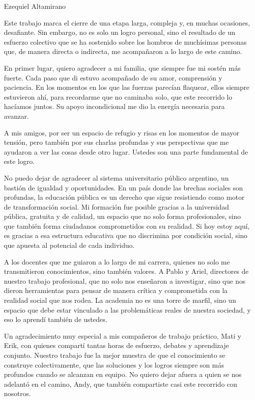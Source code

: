 \begin{acknowledgements}
\vspace{1.5cm}
Ezequiel Altamirano


Este trabajo marca el cierre de una etapa larga, compleja y, en muchas ocasiones, desafiante. Sin embargo, no es solo un logro personal, sino el resultado de un esfuerzo colectivo que se ha sostenido sobre los hombros de muchísimas personas que, de manera directa o indirecta, me acompañaron a lo largo de este camino.

En primer lugar, quiero agradecer a mi familia, que siempre fue mi sostén más fuerte. Cada paso que di estuvo acompañado de su amor, comprensión y paciencia. En los momentos en los que las fuerzas parecían flaquear, ellos siempre estuvieron ahí, para recordarme que no caminaba solo, que este recorrido lo hacíamos juntos. Su apoyo incondicional me dio la energía necesaria para avanzar.

A mis amigos, por ser un espacio de refugio y risas en los momentos de mayor tensión, pero también por sus charlas profundas y sus perspectivas que me ayudaron a ver las cosas desde otro lugar. Ustedes son una parte fundamental de este logro.

No puedo dejar de agradecer al sistema universitario público argentino, un bastión de igualdad y oportunidades. En un país donde las brechas sociales son profundas, la educación pública es un derecho que sigue resistiendo como motor de transformación social. Mi formación fue posible gracias a la universidad pública, gratuita y de calidad, un espacio que no solo forma profesionales, sino que también forma ciudadanos comprometidos con su realidad. Si hoy estoy aquí, es gracias a esa estructura educativa que no discrimina por condición social, sino que apuesta al potencial de cada individuo.

A los docentes que me guiaron a lo largo de mi carrera, quienes no solo me transmitieron conocimientos, sino también valores. A Pablo y Ariel, directores de nuestro trabajo profesional, que no solo nos enseñaron a investigar, sino que nos dieron herramientas para pensar de manera crítica y comprometida con la realidad social que nos rodea. La academia no es una torre de marfil, sino un espacio que debe estar vinculado a las problemáticas reales de nuestra sociedad, y eso lo aprendí también de ustedes.

Un agradecimiento muy especial a mis compañeros de trabajo práctico, Mati y Erik, con quienes compartí tantas horas de esfuerzo, debates y aprendizaje conjunto. Nuestro trabajo fue la mejor muestra de que el conocimiento se construye colectivamente, que las soluciones y los logros siempre son más profundos cuando se alcanzan en equipo. No quiero dejar afuera a quien se nos adelantó en el camino, Andy, que también compartiste casi este recorrido con nosotros.


\end{acknowledgements}
